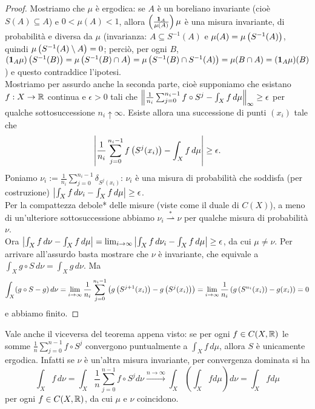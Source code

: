 \begin{proof}Mostriamo che $\mu$ è ergodica: se $A$ è un boreliano invariante (cioè $S(A)\subseteq A$)
e $0<\mu(A)<1$, allora $\left(\frac{\bm{1}_A}{\mu(A)}\right)\mu$ è una misura invariante, di probabilità e diversa da $\mu$
(invarianza: $A\subseteq S^{-1}(A)$ e $\mu(A)=\mu\left(S^{-1}(A)\right)$, quindi $\mu\left(S^{-1}(A)\setminus A\right)=0$;
perciò, per ogni $B$, $(\bm{1}_A\mu)\left(S^{-1}(B)\right)=\mu\left(S^{-1}(B)\cap A\right)=\mu\left(S^{-1}(B)\cap S^{-1}(A)\right)=\mu(B\cap A)=(\bm{1}_A\mu)(B)$)
e questo contraddice l'ipotesi. \\
Mostriamo per assurdo anche la seconda parte, cioè supponiamo che esistano $f:X\to\mathbb{R}$ continua e $\epsilon>0$ tali che
$\left\|\frac{1}{n_i}\sum_{j=0}^{n_i-1}f\circ S^j-\int_X f\,d\mu\right\|_\infty\ge\epsilon$ per qualche sottosuccessione $n_i\uparrow\infty$.
Esiste allora una successione di punti $(x_i)$ tale che
\[ \left|\frac{1}{n_i}\sum_{j=0}^{n_i-1}f\left(S^j(x_i)\right)-\int_X f\,d\mu\right|\ge\epsilon. \]
Poniamo $\nu_i:=\frac{1}{n_i}\sum_{j=0}^{n_i-1}\delta_{S^j(x_i)}$: $\nu_i$ è una misura di probabilità che soddisfa (per costruzione)
$\left|\int_X f\,d\nu_i-\int_X f\,d\mu\right|\ge\epsilon$. \\
Per la compattezza debole* delle misure (viste come il duale di $C(X)$), a meno di un'ulteriore sottosuccessione
abbiamo $\nu_i\overset{*}{\rightharpoonup}\nu$ per qualche misura di probabilità $\nu$. \\
Ora $\left|\int_X f\,d\nu-\int_X f\,d\mu\right|=\lim_{i\to\infty}\left|\int_X f\,d\nu_i-\int_X f\,d\mu\right|\ge\epsilon$, da cui $\mu\neq\nu$.
Per arrivare all'assurdo basta mostrare che $\nu$ è invariante, che equivale a $\int_X g\circ S\,d\nu=\int_X g\,d\nu$. Ma
\[ \int_X (g\circ S-g)\,d\nu=\lim_{i\to\infty}\frac{1}{n_i}\sum_{j=0}^{n_i-1}\left(g\left(S^{j+1}(x_i)\right)-g\left(S^j(x_i)\right)\right)
=\lim_{i\to\infty}\frac{1}{n_i}\left(g\left(S^{n_i}(x_i)\right)-g(x_i)\right)=0 \]
e abbiamo finito.
\end{proof}

\begin{oss}[facoltativa] Vale anche il viceversa del teorema appena visto: se per ogni $f\in C(X,\mathbb{R})$ le somme $\frac{1}{n}\sum_{j=0}^{n-1}f\circ S^j$ convergono puntualmente a $\int_X f\,d\mu$, allora $S$ è unicamente ergodica. Infatti se $\nu$ è un'altra misura invariante, per convergenza dominata si ha
\[\int_X f\,d\nu=\int_X \frac{1}{n}\sum_{j=0}^{n-1}f\circ S^j d\nu \xrightarrow{n\rightarrow\infty}\int_X \left(\int_X f d\mu\right)d\nu=\int_X f d\mu\]
per ogni $f\in C(X,\mathbb{R})$, da cui $\mu$ e $\nu$ coincidono.
\end{oss}



